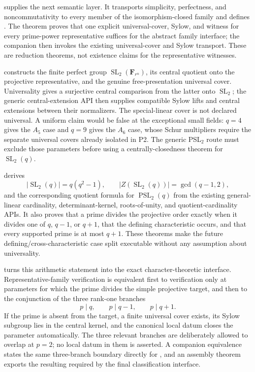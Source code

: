 \documentclass[11pt]{article}
\begin{document}
 supplies the next
semantic layer.  It transports simplicity, perfectness, and
noncommutativity to every member of the isomorphism-closed family and
defines
.
The theorem  proves that one explicit universal-cover,
Sylow, and  witness for every prime-power
representative suffices for the abstract family interface; the companion
 then invokes the existing
universal-cover and Sylow transport.  These are reduction theorems, not
existence claims for the representative witnesses.

 constructs the
finite perfect group \(\operatorname{SL}_2(\mathbf F_{r^n})\), its central
quotient onto the projective representative, and the genuine
free-presentation universal cover.  Universality gives a surjective central
comparison from the latter onto \(\operatorname{SL}_2\); the generic
central-extension API then supplies compatible Sylow lifts and central
extensions between their normalizers.  The special-linear cover is not
declared universal.  A uniform claim would be false at the exceptional
small fields: \(q=4\) gives the \(A_5\) case and \(q=9\) gives the
\(A_6\) case, whose Schur multipliers require the separate universal covers
already isolated in P2.  The generic PSL\(_2\) route must exclude those
parameters before using a centrally-closedness theorem for
\(\operatorname{SL}_2(q)\).

 derives
\[
  |\operatorname{SL}_2(q)|=q(q^2-1),\qquad
  |Z(\operatorname{SL}_2(q))|=\gcd(q-1,2),
\]
and the corresponding quotient formula for
\(\operatorname{PSL}_2(q)\) from the existing general-linear cardinality,
determinant-kernel, roots-of-unity, and quotient-cardinality APIs.  It also
proves that a prime divides the projective order exactly when it divides
one of \(q\), \(q-1\), or \(q+1\), that the defining characteristic occurs,
and that every supported prime is at most \(q+1\).  These theorems make the
future defining/cross-characteristic case split executable without any
assumption about universality.

 turns this
arithmetic statement into the exact character-theoretic interface.
Representative-family verification is equivalent first to verification
only at parameters for which the prime divides the simple projective
target, and then to the conjunction of the three rank-one branches
\[
  p\mid q,\qquad p\mid q-1,\qquad p\mid q+1.
\]
If the prime is absent from the target, a finite universal cover exists,
its Sylow subgroup lies in the central kernel, and the canonical local
datum closes the parameter automatically.  The three relevant branches
are deliberately allowed to overlap at \(p=2\); no local datum in them is
asserted.  A companion equivalence states the same three-branch boundary
directly for
, and an assembly theorem
exports the resulting
 required
by the final classification interface.
\end{document}
